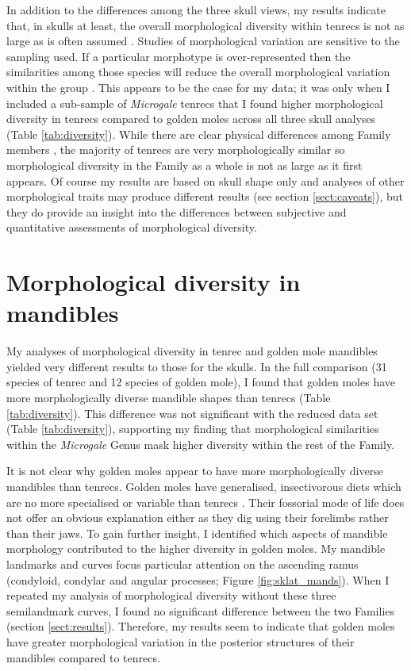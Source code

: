 	

	In addition to the differences among the three skull views, my results indicate that, in skulls at least, the overall morphological diversity within tenrecs is not as large as is often assumed \citep[e.g.][]{Eisenberg1969, Olson2013}. Studies of morphological variation are sensitive to the sampling used. If a particular morphotype is over-represented then the similarities among those species will reduce the overall morphological variation within the group \citep{Foote1991}. This appears to be the case for my data; it was only when I included a sub-sample of \textit{Microgale} tenrecs that I found higher morphological diversity in tenrecs compared to golden moles across all three skull analyses (Table \ref{tab:diversity}).
	While there are clear physical differences among Family members \citep{Olson2013, Eisenberg1969}, the majority of tenrecs are very morphologically similar \citep{Jenkins2003} so morphological diversity in the Family as a whole is not as large as it first appears. Of course my results are based on skull shape only and analyses of other morphological traits may produce different results (see section \ref{sect:caveats}), but they do provide an insight into the differences between subjective and quantitative assessments of morphological diversity.  

\section{Morphological diversity in mandibles}
	My analyses of morphological diversity in tenrec and golden mole mandibles yielded very different results to those for the skulls. In the full comparison (31 species of tenrec and 12 species of golden mole), I found that golden moles have more morphologically diverse mandible shapes than tenrecs (Table \ref{tab:diversity}). This difference was not significant with the reduced data set (Table \ref{tab:diversity}), supporting my finding that morphological similarities within the \textit{Microgale} Genus mask higher diversity within the rest of the Family.
	
	It is not clear why golden moles appear to have more morphologically diverse mandibles than tenrecs. Golden moles have generalised, insectivorous diets \citep{Bronner1995} which are no more specialised or variable than tenrecs \citep{Soarimalala2011}. Their fossorial mode of life does not offer an obvious explanation either as they dig using their forelimbs rather than their jaws.
	To gain further insight, I identified which aspects of mandible morphology contributed to the higher diversity in golden moles. My mandible landmarks and curves focus particular attention on the ascending ramus (condyloid, condylar and angular processes; Figure \ref{fig:sklat_mands}). When I repeated my analysis of morphological diversity without these three semilandmark curves, I found no significant difference between the two Families (section \ref{sect:results}). Therefore, my results seem to indicate that golden moles have greater morphological variation in the posterior structures of their mandibles compared to tenrecs. 
	
